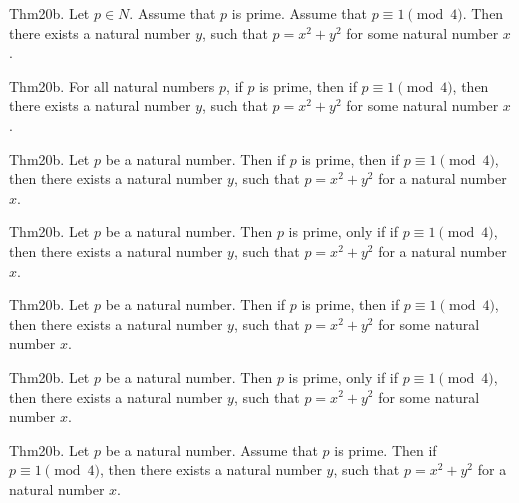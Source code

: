 \documentclass{article}
\begin{document}
Thm20b. Let $p \in N$. Assume that $p$ is prime. Assume that $p \equiv 1 \pmod{ 4}$. Then there exists a natural number $y$, such that $p = x ^{ 2}+ y ^{ 2}$ for some natural number $x$.

Thm20b. For all natural numbers $p$, if $p$ is prime, then if $p \equiv 1 \pmod{ 4}$, then there exists a natural number $y$, such that $p = x ^{ 2}+ y ^{ 2}$ for some natural number $x$.

Thm20b. Let $p$ be a natural number. Then if $p$ is prime, then if $p \equiv 1 \pmod{ 4}$, then there exists a natural number $y$, such that $p = x ^{ 2}+ y ^{ 2}$ for a natural number $x$.

Thm20b. Let $p$ be a natural number. Then $p$ is prime, only if if $p \equiv 1 \pmod{ 4}$, then there exists a natural number $y$, such that $p = x ^{ 2}+ y ^{ 2}$ for a natural number $x$.

Thm20b. Let $p$ be a natural number. Then if $p$ is prime, then if $p \equiv 1 \pmod{ 4}$, then there exists a natural number $y$, such that $p = x ^{ 2}+ y ^{ 2}$ for some natural number $x$.

Thm20b. Let $p$ be a natural number. Then $p$ is prime, only if if $p \equiv 1 \pmod{ 4}$, then there exists a natural number $y$, such that $p = x ^{ 2}+ y ^{ 2}$ for some natural number $x$.

Thm20b. Let $p$ be a natural number. Assume that $p$ is prime. Then if $p \equiv 1 \pmod{ 4}$, then there exists a natural number $y$, such that $p = x ^{ 2}+ y ^{ 2}$ for a natural number $x$.
\end{document}
